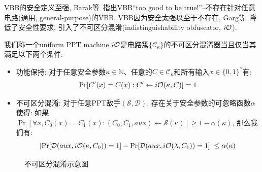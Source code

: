 VBB的安全定义至强, Barak等~\cite{Barak-CRYPTO-2001}指出VBB``too good to be true!''--不存在针对任意电路(通用, general-purpose)的VBB. 
VBB因为安全太强以至于不存在, Garg等~\cite{Garg-FOCS-2013}降低了安全性要求, 引入了不可区分混淆(indistinguishability obfuscator, $\iO$). 
\begin{definition}[不可区分混淆($\iO$)]
我们称一个uniform PPT machine $\iO$是电路簇$\{\mathcal{C}_\kappa\}$的不可区分混淆器当且仅当其满足以下两个条件:
\begin{itemize}
\item 功能保持: 对于任意安全参数$\kappa \in \mathbb{N}$、任意的$C \in \mathcal{C}_\kappa$和所有输入$x \in \{0,1\}^*$有:
    \begin{equation*}
        \Pr[C'(x) = C(x): C' \leftarrow i\mathcal{O}(\kappa, C)] = 1
    \end{equation*} 

\item 不可区分混淆: 对于任意PPT敌手$(\mathcal{S}, \mathcal{D})$, 存在关于安全参数的可忽略函数$\alpha$使得: 
    如果$\Pr[\forall x, C_0(x) = C_1(x): (C_0, C_1, aux) \leftarrow \mathcal{S}(\kappa)] \geq 1 - \alpha(\kappa)$, 
    那么我们有: 
    \begin{equation*}
        \left|\Pr[\mathcal{D}(aux, i\mathcal{O}(\kappa, C_0)) = 1] - 
        \Pr[\mathcal{D}(aux, i\mathcal{O}(\lambda, C_1)) = 1]\right| \leq \alpha(\kappa)
    \end{equation*}   
\end{itemize} 
\end{definition}

\begin{figure}[!hbtp]
\begin{center}
\end{center}
\caption{不可区分混淆示意图}
\end{figure}


